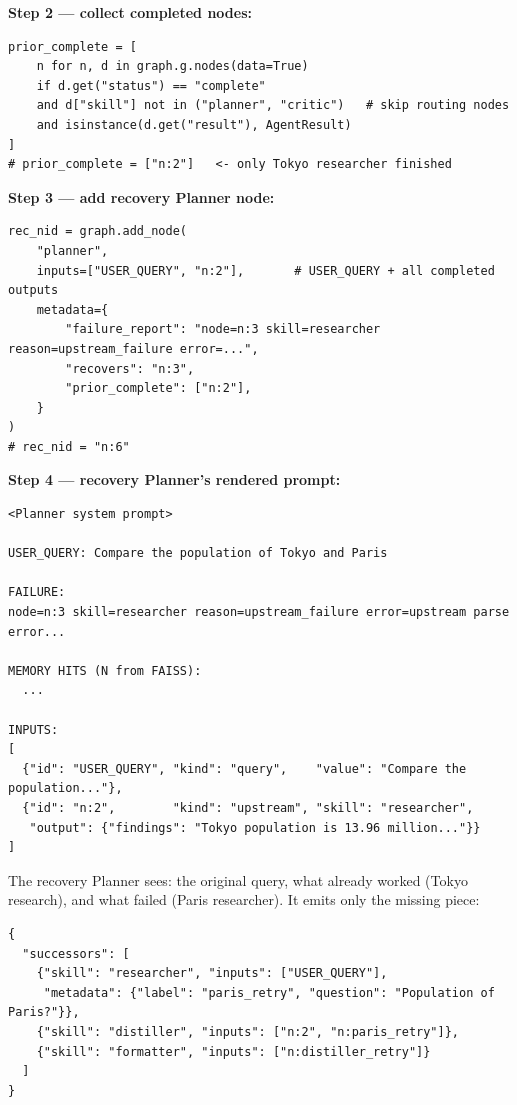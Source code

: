 \documentclass[12pt,a4paper]{article}
\begin{document}
\textbf{Step 2 — collect completed nodes:}
\begin{lstlisting}[style=pycode, caption={Collecting prior completed nodes — flow.py:304--310}]
prior_complete = [
    n for n, d in graph.g.nodes(data=True)
    if d.get("status") == "complete"
    and d["skill"] not in ("planner", "critic")   # skip routing nodes
    and isinstance(d.get("result"), AgentResult)
]
# prior_complete = ["n:2"]   <- only Tokyo researcher finished
\end{lstlisting}

\textbf{Step 3 — add recovery Planner node:}
\begin{lstlisting}[style=pycode, caption={Adding recovery Planner — flow.py:311--321}]
rec_nid = graph.add_node(
    "planner",
    inputs=["USER_QUERY", "n:2"],       # USER_QUERY + all completed outputs
    metadata={
        "failure_report": "node=n:3 skill=researcher reason=upstream_failure error=...",
        "recovers": "n:3",
        "prior_complete": ["n:2"],
    }
)
# rec_nid = "n:6"
\end{lstlisting}

\textbf{Step 4 — recovery Planner's rendered prompt:}
\begin{lstlisting}[style=plaincode, caption={What the recovery Planner LLM receives}]
<Planner system prompt>

USER_QUERY: Compare the population of Tokyo and Paris

FAILURE:
node=n:3 skill=researcher reason=upstream_failure error=upstream parse error...

MEMORY HITS (N from FAISS):
  ...

INPUTS:
[
  {"id": "USER_QUERY", "kind": "query",    "value": "Compare the population..."},
  {"id": "n:2",        "kind": "upstream", "skill": "researcher",
   "output": {"findings": "Tokyo population is 13.96 million..."}}
]
\end{lstlisting}

The recovery Planner sees: the original query, what already worked (Tokyo
research), and what failed (Paris researcher). It emits only the missing piece:

\begin{lstlisting}[style=jsoncode]
{
  "successors": [
    {"skill": "researcher", "inputs": ["USER_QUERY"],
     "metadata": {"label": "paris_retry", "question": "Population of Paris?"}},
    {"skill": "distiller", "inputs": ["n:2", "n:paris_retry"]},
    {"skill": "formatter", "inputs": ["n:distiller_retry"]}
  ]
}
\end{lstlisting}
\end{document}
